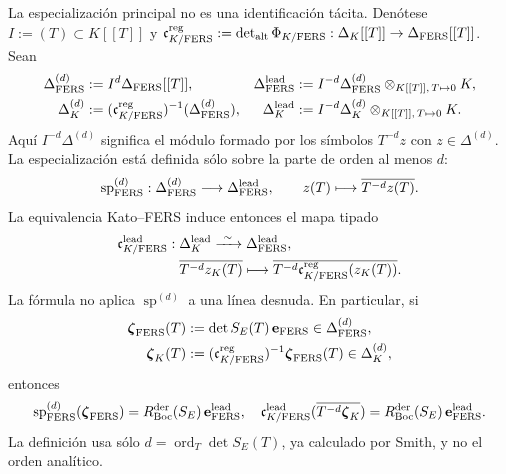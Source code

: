 La especialización principal no es una identificación tácita. Denótese
$I:=(T)\subset K[[T]]$ y
$\mathfrak c_{K/{\rm FERS}}^{\rm reg}:=
\det_{\rm alt}\Phi_{K/{\rm FERS}}:\Delta_K[[T]]\to
\Delta_{\rm FERS}[[T]]$. Sean
\begin{equation}\label{eq:pdf2-bsd-lineas-leading}
 \begin{aligned}
  \Delta_{\rm FERS}^{(d)}&:=I^d\Delta_{\rm FERS}[[T]],&
  \Delta_{\rm FERS}^{\rm lead}
    &:=I^{-d}\Delta_{\rm FERS}^{(d)}
       \otimes_{K[[T]],\,T\mapsto0}K,\\
  \Delta_K^{(d)}&:=(\mathfrak c_{K/{\rm FERS}}^{\rm reg})^{-1}
       (\Delta_{\rm FERS}^{(d)}),&
  \Delta_K^{\rm lead}
    &:=I^{-d}\Delta_K^{(d)}
       \otimes_{K[[T]],\,T\mapsto0}K.
 \end{aligned}
\end{equation}
Aquí $I^{-d}\Delta^{(d)}$ significa el módulo formado por los símbolos
$T^{-d}z$ con $z\in\Delta^{(d)}$. La especialización está definida sólo
sobre la parte de orden al menos $d$:
\begin{equation}\label{eq:pdf2-bsd-sp-leading-tipado}
 \operatorname{sp}^{(d)}_{\rm FERS}:
 \Delta_{\rm FERS}^{(d)}\longrightarrow
 \Delta_{\rm FERS}^{\rm lead},
 \qquad
 z(T)\longmapsto
 \overline{T^{-d}z(T)}.
\end{equation}
La equivalencia Kato--FERS induce entonces el mapa tipado
\begin{equation}\label{eq:pdf2-bsd-c-k-fers-leading}
 \begin{aligned}
 \mathfrak c_{K/{\rm FERS}}^{\rm lead}:{}
 &\Delta_K^{\rm lead}\xrightarrow{\ \sim\ }
   \Delta_{\rm FERS}^{\rm lead},\\
 &\overline{T^{-d}z_K(T)}\longmapsto
   \overline{T^{-d}
   \mathfrak c_{K/{\rm FERS}}^{\rm reg}(z_K(T))}.
 \end{aligned}
\end{equation}
La fórmula no aplica $\operatorname{sp}^{(d)}$ a una línea desnuda. En
particular, si
\begin{equation}\label{eq:pdf2-bsd-seccion-zeta-leading}
 \begin{aligned}
  \boldsymbol\zeta_{\rm FERS}(T)
    &:=\det S_E(T)\,\mathbf e_{\rm FERS}
       \in\Delta_{\rm FERS}^{(d)},\\
  \boldsymbol\zeta_K(T)
    &:=(\mathfrak c_{K/{\rm FERS}}^{\rm reg})^{-1}
       \boldsymbol\zeta_{\rm FERS}(T)
       \in\Delta_K^{(d)},
 \end{aligned}
\end{equation}
entonces
\begin{equation}\label{eq:pdf2-bsd-especializacion-zeta}
 \operatorname{sp}^{(d)}_{\rm FERS}
       (\boldsymbol\zeta_{\rm FERS})
 =R_{\rm Boc}^{\rm der}(S_E)\,
       \mathbf e_{\rm FERS}^{\rm lead},
 \quad
 \mathfrak c_{K/{\rm FERS}}^{\rm lead}
       (\overline{T^{-d}\boldsymbol\zeta_K})
 =R_{\rm Boc}^{\rm der}(S_E)\,
       \mathbf e_{\rm FERS}^{\rm lead}.
\end{equation}
La definición usa sólo $d=\operatorname{ord}_T\det S_E(T)$, ya calculado por
Smith, y no el orden analítico.

